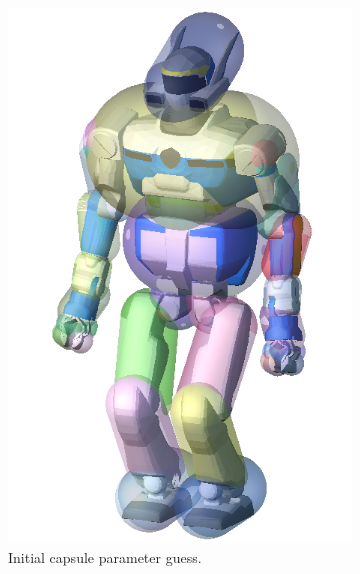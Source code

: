 \begin{figure}
\begin{subfigure}{0.24\columnwidth}
    \includegraphics[width = \columnwidth]
                    {src/chap3-optimal-motion-planning/figure/hrp2-bounding-capsule.png}
    \caption{Initial capsule parameter guess.}
    \label{capsulea}
  \end{subfigure}
  \begin{subfigure}{0.24\columnwidth}
    \centering

\end{subfigure}
\end{figure}
